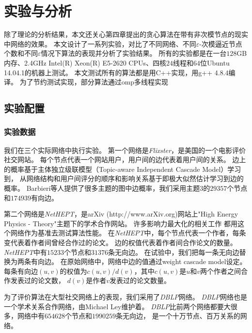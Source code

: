\chapter{实验与分析}

除了理论的分析结果，本文还关心第四章提出的贪心算法在带有非次模节点的现实中网络的效果。
本文设计了一系列实验，对比了不同网络、不同$\varepsilon$-次模逼近节点个数和不同$\varepsilon$情况下算法的表现并分析了实验结果。
所有的实验都是在一台$128$GB内存、2.4GHz Intel(R) Xeon(R) E5-2620 CPUs、四核$24$线程和$64$位Ubuntu 14.04.1的机器上测试。
本文测试所有的算法都是用C++实现，用g++ 4.8.4编译。
为了节约测试实现，部分算法通过omp多线程实现

\section{实验配置}

\subsection{实验数据}
我们在三个实际网络中执行实验。
第一个网络是{\em Flixster}，是美国的一个电影评价社交网站。
每个节点代表一个网站用户，用户间的边代表着用户间的关系。
边上的概率基于主体独立级联模型\cite{barbieri2012topic}（Topic-aware Independent Cascade Model）学习到，
从网络结构和用户间评分的顺序和影响关系基于即极大似然估计学习到边的概率。
Barbieri等人\cite{barbieri2012topic}提供了很多主题的图中边概率，我们采用主题3的$29357$个节点和$174939$有向边。

第二个网络是{\em NetHEPT}，是arXiv (http://www.arXiv.org)网站上"High Energy Physics - Theory"主题下的学术合作网站。
许多影响力最大化的相关工作
\cite{Chen2009efficient,chen2010sharpphard,Goyal2011simpath,goyal2012minimizing,mtai2016sigmod}
都用这个网络作为基准去测试算法性能。
在{\em NetHEPT}中，每个节点代表一个作者，每条变代表着作者间曾经合作过的论文。
边的权值代表着作者间合作论文的数量。
{\em NetHEPT}中有$15233$个节点和$31376$条无向边。
在试验中，我们把每一条无向边替换为两条有向边。
在原始网络中，网络中边的值通过weight cascade model\cite{Kempe2003maximizing}设定。
每条有向边$(u,v)$的权值为$c(u,v)/d(v)$，其中$c(u,v)$是$u$和$v$两个作者之间合作发表过的论文数，
$d(v)$是作者$v$发表过的论文数量。

为了评价算法在大型社交网络上的表现，我们采用了{\em DBLP}网络。
{\em DBLP}网络也是一个学术关系合作网络，由Michael Ley维护着。
{\em DBLP}比前两个网络都要大很多，网络中有$654628$个节点和$1990259$条无向边，
是一个十万节点、百万关系的网络。


